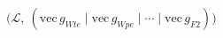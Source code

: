 \documentclass{article}
\begin{document}
\begin{preview}
$\displaystyle \bigl(\mathcal{L},\ (\mathrm{vec}\,g_{Wte} \mid \mathrm{vec}\,g_{Wpe} \mid \cdots \mid \mathrm{vec}\,g_{F2})\bigr)$
\end{preview}
\end{document}
